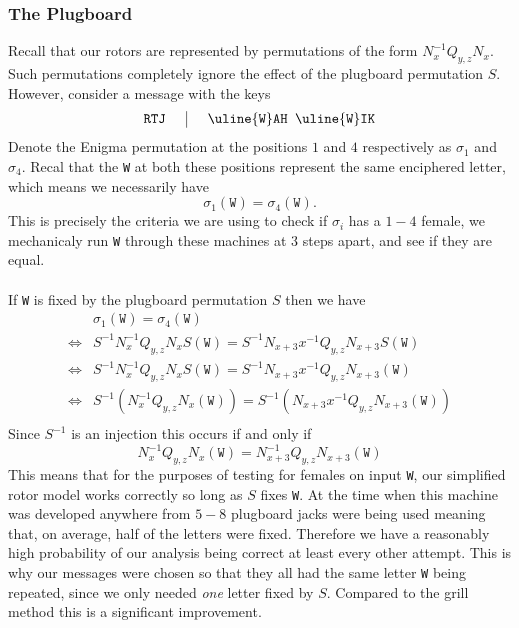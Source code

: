 \subsubsection{The Plugboard}
Recall that our rotors are represented by permutations of the form $N_{x}^{-1}Q_{y,z}N_{x}$. Such permutations completely ignore the effect of the plugboard permutation $S$. However, consider a message with the keys
\[
	\setlength{\arraycolsep}{15pt}
	\begin{array}{c | c}
		\texttt{RTJ} & {\uline{\texttt{W}}}\texttt{AH }{\uline{\texttt{W}}}\texttt{IK} \\
	\end{array}
\]
Denote the Enigma permutation at the positions $1$ and $4$ respectively as $\sigma_1$ and $\sigma_4$. Recal that the \texttt{W} at both these positions represent the same enciphered letter, which means we necessarily have
\[
	\sigma_1(\texttt{W}) = \sigma_4(\texttt{W}).
\]
This is precisely the criteria we are using to check if $\sigma_i$ has a $1-4$ female, we mechanicaly run \texttt{W} through these machines at 3 steps apart, and see if they are equal.
\\\\If \texttt{W} is fixed by the plugboard permutation $S$ then we have
\begin{align*}
	     & \sigma_1(\texttt{W}) = \sigma_4(\texttt{W})                                              \\
	\iff & S^{-1}N_x^{-1}Q_{y,z}N_xS(\texttt{W}) = S^{-1}N_{x+3}x^{-1}Q_{y,z}N_{x+3}S(\texttt{W})   \\
	\iff & S^{-1}N_x^{-1}Q_{y,z}N_xS(\texttt{W}) = S^{-1}N_{x+3}x^{-1}Q_{y,z}N_{x+3}(\texttt{W})    \\
	\iff & S^{-1}(N_x^{-1}Q_{y,z}N_x(\texttt{W})) = S^{-1}(N_{x+3}x^{-1}Q_{y,z}N_{x+3}(\texttt{W})) \\
\end{align*}
Since $S^{-1}$ is an injection this occurs if and only if
\[
	N_x^{-1}Q_{y,z}N_x(\texttt{W}) = N_{x+3}^{-1}Q_{y,z}N_{x+3}(\texttt{W})
\]
This means that for the purposes of testing for females on input \texttt{W}, our simplified rotor model works correctly so long as $S$ fixes \texttt{W}. At the time when this machine was developed anywhere from $5-8$ plugboard jacks were being used meaning that, on average, half of the letters were fixed. Therefore we have a reasonably high probability of our analysis being correct at least every other attempt. This is why our messages were chosen so that they all had the same letter \texttt{W} being repeated, since we only needed \emph{one} letter fixed by $S$. Compared to the grill method this is a significant improvement.

